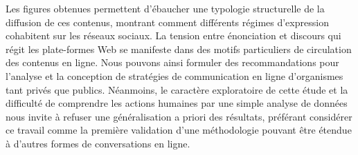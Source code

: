 Les figures obtenues permettent d’ébaucher une typologie structurelle de la diffusion de ces contenus, montrant comment différents régimes d'expression cohabitent sur les réseaux sociaux. La tension entre énonciation et discours qui régit les plate-formes Web se manifeste dans des motifs particuliers de circulation des contenus en ligne. Nous pouvons ainsi formuler des recommandations pour l’analyse et la conception de stratégies de communication en ligne d’organismes tant privés que publics. Néanmoins, le caractère exploratoire de cette étude et la difficulté de comprendre les actions humaines par une simple analyse de données nous invite à refuser une généralisation a priori des résultats, préférant considérer ce travail comme la première validation d’une méthodologie pouvant être étendue à d’autres formes de conversations en ligne.


